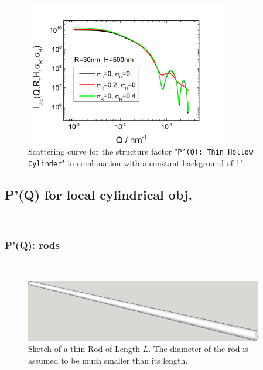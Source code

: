 \begin{figure}[htb]
\begin{center}
\includegraphics[width=0.8\textwidth,height=0.55\textwidth]{../images/form_factor/anisotropic/PprimeThinHollowCylinder.png}
\end{center}
\caption{Scattering curve for the structure factor "\texttt{P'(Q): Thin Hollow Cylinder}" in combination with a constant background of 1".}
\label{fig_IQ:PprimeThinHollowCylinder}
\end{figure}


\clearpage
\subsection{P'(Q) for local cylindrical obj.} ~\\
\label{plugin:Pprime4cylindrical}


\clearpage
\subsubsection{P'(Q): rods} ~\\
\label{plugin:Pprime4rods}

\begin{figure}[htb]
\begin{center}
\includegraphics[width=0.926\textwidth,height=0.24\textwidth]{../images/form_factor/anisotropic/ThinRod.png}
\end{center}
\caption{Sketch of a thin Rod of Length $L$. The diameter of the rod is assumed to be much smaller than its length.}
\label{fig:ThinRod}
\end{figure}

